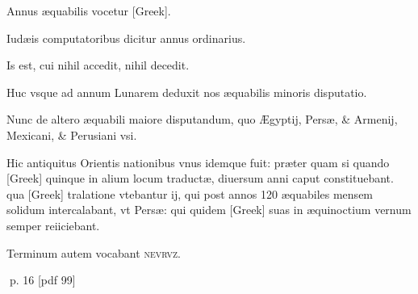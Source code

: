 \begin{parnumbers}
Annus æquabilis vocetur \textgreek{[Greek]}.

Iudæis computatoribus  dicitur annus ordinarius.

Is est, cui nihil accedit, nihil decedit.

Huc vsque ad annum Lunarem deduxit nos æquabilis minoris disputatio.

Nunc de altero æquabili maiore disputandum, quo Ægyptij, Persæ, \& Armenij, Mexicani, \& Perusiani vsi.

Hic antiquitus Orientis nationibus vnus idemque fuit: præter quam si quando \textgreek{[Greek]} quinque in alium locum traductæ, diuersum anni caput constituebant. qua \textgreek{[Greek]} tralatione vtebantur ij, qui post annos 120 æquabiles mensem solidum intercalabant, vt Persæ: qui quidem \textgreek{[Greek]} suas in æquinoctium vernum semper reiiciebant.

Terminum autem vocabant \textsc{nevrvz}.
\end{parnumbers}
\clearpage
p. 16 [pdf 99]

